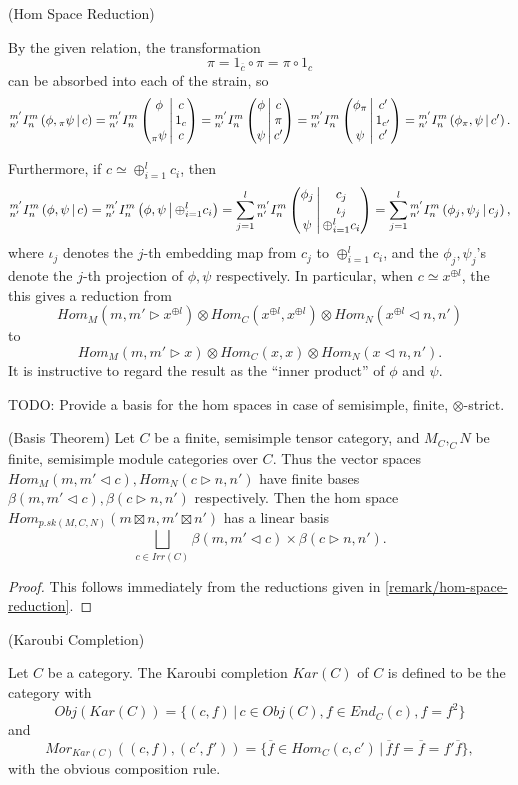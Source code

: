 \begin{remark}\label{remark/hom-space-reduction} (Hom Space Reduction)

  \noindent By the given relation, the
  transformation
  \[
    \pi = 1_{\overline{c}} \circ \pi = \pi \circ 1_{c}
  \]
  can be absorbed into each of the strain, so
  \[
    {}^{m'}_{n'} I^{m}_{n} \left( \phi, {}_{\pi}\psi \,\middle|\, c \right) =
    {}^{m'}_{n'} I^{m}_{n} \left( \begin{matrix} \phi \\ {}\\ {}_{\pi}\psi \end{matrix} \,\middle|\, \begin{matrix} c \\ 1_{c} \\ c \end{matrix} \right) =
    {}^{m'}_{n'} I^{m}_{n} \left( \begin{matrix} \phi \\ {}\\ \psi \end{matrix} \,\middle|\, \begin{matrix} c \\ \pi \\ c' \end{matrix} \right) =
    {}^{m'}_{n'} I^{m}_{n} \left( \begin{matrix} \phi_{\pi} \\ {}\\ \psi \end{matrix} \,\middle|\, \begin{matrix} c' \\ 1_{c'} \\ c' \end{matrix} \right) =
    {}^{m'}_{n'} I^{m}_{n} \left( \phi_{\pi}, \psi \,\middle|\, c' \right).
  \]

  \noindent Furthermore, if $c \simeq \oplus_{i=1}^{l} c_{i}$, then
  \[
    {}^{m'}_{n'} I^{m}_{n} \left( \phi, \psi \,\middle|\, c \right) = {}^{m'}_{n'} I^{m}_{n} \left( \phi, \psi \,\middle|\, \oplus_{i=1}^{l} c_{i} \right) = \sum_{j=1}^{l} {}^{m'}_{n'} I^{m}_{n} \left( \begin{matrix} \phi_{j} \\ {}\\ \psi \end{matrix} \,\middle|\, \begin{matrix} c_{j} \\ \iota_{j} \\ \oplus_{i=1}^{l} c_{i} \end{matrix} \right) =
    \sum_{j=1}^{l}{}^{m'}_{n'} I^{m}_{n} \left( \phi_{j}, \psi_{j} \,\middle|\, c_{j} \right),
  \]
  where $\iota_{j}$ denotes the $j$-th embedding map from $c_{j}$ to
  $\oplus_{i=1}^{l}c_{i}$, and the $\phi_{j}, \psi_{j}$'s denote the $j$-th
  projection of $\phi, \psi$ respectively. In particular, when
  $c \simeq x^{\oplus l}$, the this gives a reduction from
  \[
    Hom_{M}(m, m' \rhd x^{\oplus l}) \otimes Hom_{C}(x^{\oplus l}, x^{\oplus l}) \otimes Hom_{N} (x^{\oplus l} \lhd n, n')
  \]
  to
  \[
    Hom_{M}(m, m' \rhd x) \otimes Hom_{C}(x, x) \otimes Hom_{N} (x \lhd n, n').
  \]
  It is instructive to regard the result as the ``inner product'' of $\phi$
  and $\psi$.
\end{remark}

\noindent TODO: Provide a basis for the hom spaces in case of semisimple,
finite, $\otimes$-strict.

\begin{proposition} (Basis Theorem) Let $C$ be a finite, semisimple tensor
  category, and $M_{C}, _{C}N$ be finite, semisimple module categories over
  $C$. Thus the vector spaces $Hom_{M}(m, m' \lhd c), Hom_{N}(c \rhd n, n')$ have
  finite bases $\beta(m, m' \lhd c), \beta(c \rhd n, n')$ respectively. Then the hom
  space $Hom_{p.sk(M,C,N)}(m \boxtimes n, m' \boxtimes n')$ has a linear basis
  \[
    \bigsqcup_{c \in Irr(C)} \beta(m, m' \lhd c) \times \beta(c \rhd n, n').
  \]
\end{proposition}
\begin{proof}
  This follows immediately from the reductions given in \ref{remark/hom-space-reduction}.
\end{proof}

\begin{definition} (Karoubi Completion)

  \noindent Let $C$ be a category. The Karoubi completion $Kar(C)$ of $C$ is defined to be the category with
  \[
    Obj(Kar(C)) = \{(c, f) \,|\, c \in Obj(C), f \in End_{C}(c), f = f^{2}\}
  \] and
  \[
    Mor_{Kar(C)}((c,f), (c', f')) = \{\overline{f} \in Hom_{C}(c,c') \,|\, \overline{f}f = \overline{f} = f'\overline{f}\},
  \]
  with the obvious composition rule.
\end{definition}

